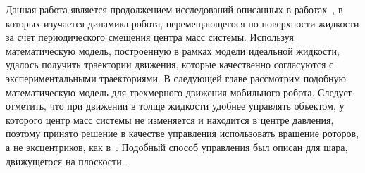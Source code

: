 Данная работа является продолжением исследований описанных в работах~\cite{Klenov_diss, Klenov_Kilin_2016}, в которых изучается динамика робота, перемещающегося по поверхности жидкости за счет периодического смещения центра масс системы. Используя математическую модель, построенную в рамках модели идеальной жидкости, удалось получить траектории движения, которые качественно согласуются с экспериментальными траекториями. В следующей главе рассмотрим подобную математическую модель для трехмерного движения мобильного робота. Следует отметить, что при движении в толще жидкости удобнее управлять объектом, у которого центр масс системы не изменяется и находится в центре давления, поэтому принято решение в качестве управления использовать вращение роторов, а не эксцентриков, как в~\cite{Klenov_diss, Klenov_Kilin_2016}. Подобный способ управления был описан для шара, движущегося на плоскости~\cite{BKM_Chapligin1, BKM_Chapligin2}.



